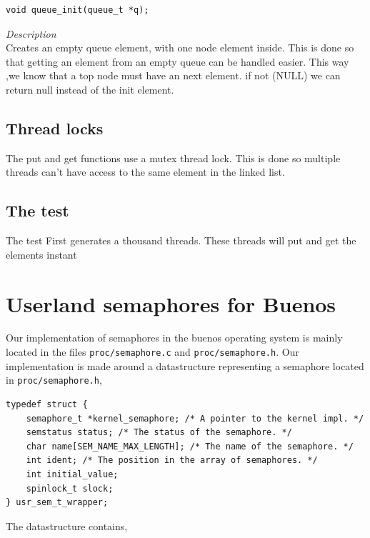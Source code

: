 \documentclass[11pt]{article}
\begin{document}
\begin{lstlisting}[style=customc]
void queue_init(queue_t *q);
\end{lstlisting}
\textit{Description} \\
Creates an empty queue element, with one node element inside. This is done so that getting an element from an empty queue can be handled easier. This way ,we know that a top node must have an next element. if not (NULL) we can return null instead of the init element.

\subsection{Thread locks}
The put and get functions use a mutex thread lock. This is done so multiple threads can't have access to the same element in the linked list.
\subsection{The test}
The test First generates a thousand threads. These threads will put and get the elements instant

\section{Userland semaphores for Buenos}
    Our implementation of semaphores in the buenos operating system is mainly
    located in the files \texttt{proc/semaphore.c} and
    \texttt{proc/semaphore.h}.  Our implementation is made around a
    datastructure representing a semaphore located in \texttt{proc/semaphore.h},

    \begin{lstlisting}[style=customc]
typedef struct {
    semaphore_t *kernel_semaphore; /* A pointer to the kernel impl. */
    semstatus status; /* The status of the semaphore. */
    char name[SEM_NAME_MAX_LENGTH]; /* The name of the semaphore. */
    int ident; /* The position in the array of semaphores. */
    int initial_value;
    spinlock_t slock;
} usr_sem_t_wrapper;
    \end{lstlisting}

    The datastructure contains,
\end{document}
